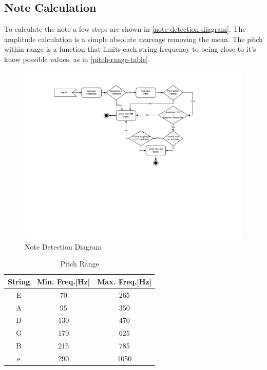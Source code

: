 \subsection{Note Calculation}
To calculate the note a few steps are shown in \autoref{note-detection-diagram}.
The amplitude calculation is a simple absolute avareage removing the mean. The
pitch within range is a function that limits each string frequency to
being close to it's know possible values, as in \autoref{pitch-range-table}.
\begin{figure}[htb]
	\caption{Note Detection Diagram}
	\label{note-detection-diagram}
	\begin{center}
		\includegraphics[width=0.7\paperwidth]{images/note-detection-flow-diagram.pdf}
	\end{center}
\end{figure}

\begin{table}[htb]
  \ABNTEXreducedfont
  \caption[Pitch Range]{Pitch Range}
  \label{pitch-range-table}
  \centering
  \begin{tabular}{c|c|c}
    \textbf{String} & \textbf{Min. Freq.[Hz]} & \textbf{Max. Freq.[Hz]} \\
		\hline \hline
		E & 70 & 265 \\
		\hline
		A & 95 & 350 \\
		\hline
		D & 130 & 470 \\
		\hline
		G & 170 & 625 \\
		\hline
		B & 215 & 785 \\
		\hline
		e & 290 & 1050 \\
  \end{tabular}
\end{table}

